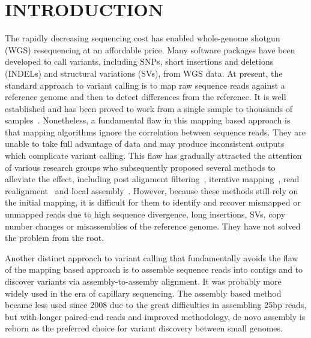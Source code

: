 \documentclass{bioinfo}
\begin{document}
\vspace*{-1em}

\section{INTRODUCTION}

The rapidly decreasing sequencing cost has enabled whole-genome shotgun (WGS)
resequencing at an affordable price. Many software packages have been developed
to call variants, including SNPs, short insertions and deletions (INDELs) and
structural variations (SVs), from WGS data. At present, the standard approach to
variant calling is to map raw sequence reads against a reference genome and then
to detect differences from the reference. It is well established and has been
proved to work from a single sample to thousands of
samples~\citep{1000-Genomes-Project-Consortium:2010qc}. Nonetheless, a
fundamental flaw in this mapping based approach is that mapping algorithms
ignore the correlation between sequence reads. They are unable to take full
advantage of data and may produce inconsistent outputs which complicate variant
calling.  This flaw has gradually attracted the attention of various research
groups who subsequently proposed several methods to alleviate the effect,
including post alignment
filtering~\citep{Ossowski:2008if}, iterative mapping~\citep{Manske:2009ve},
read realignment~\citep{Albers:2010ud,Homer:2010kx,Li:2011kx,Depristo:2011vn}
and local assembly~\citep{Carnevali:2011fk}.  However, because these methods
still rely on the initial mapping, it is difficult for them to identify and
recover mismapped or unmapped reads due to high sequence divergence, long
insertions, SVs, copy number changes or misassemblies of the reference genome.
They have not solved the problem from the root.

Another distinct approach to variant calling that fundamentally avoids the flaw of the
mapping based approach is to assemble sequence reads into contigs and to
discover variants via assembly-to-assemby alignment. It was probably more
widely used in the era of capillary sequencing. The assembly based method
became less used since 2008 due to the great difficulties in assembling 25bp
reads, but with longer paired-end reads and improved methodology,
de novo assembly is reborn as the preferred choice for variant discovery
between small genomes.
\end{document}
